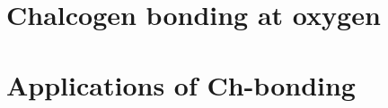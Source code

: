 \documentclass[a4paper, 12pt]{Thesis}  %
\begin{document}




\part{Chalcogen bonding at oxygen}



\part{Applications of Ch-bonding}











\appendix %




\backmatter


\end{document}
